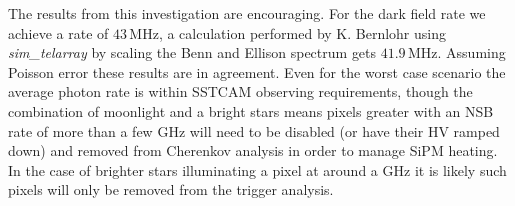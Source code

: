 The results from this investigation are encouraging. For the dark field rate we achieve a rate of $\mathrm{43\,MHz}$, a calculation performed by K. Bernlohr using \textit{sim\_telarray} by scaling the Benn and Ellison spectrum \cite{BandE} gets $\mathrm{41.9\,MHz}$. Assuming Poisson error these results are in agreement. Even for the worst case scenario the average photon rate is within SSTCAM observing requirements, though the combination of moonlight and a bright stars means pixels greater with an NSB rate of more than a few GHz will need to be disabled (or have their HV ramped down) and removed from Cherenkov analysis in order to manage SiPM heating. In the case of brighter stars illuminating a pixel at around a GHz it is likely such pixels will only be removed from the trigger analysis.
\begin{table}[h]
    \centering
    \caption{Observation Parameters for the Four Eta Carinae Runs.  The observing Altitude (ALT) and Azimuth (AZ) are presented, along with the simulated source Right Ascension (RA) and Declination (DEC). The moonlit Eta Carinae runs are at a low altitude that an IACT would not normally observe at, but since the \textit{nsb} model does not contain a full atmospheric model this is inconsequential. Times are in UTC.}
    \label{tab:etacar_params}
\end{table}

